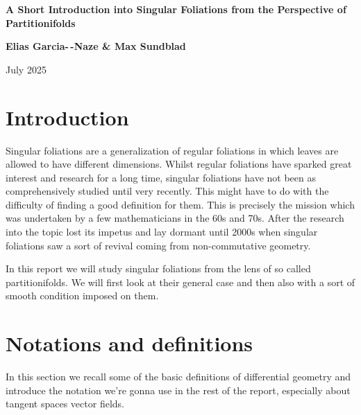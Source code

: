 



\begin{titlepage}
   \begin{center}
       \vspace*{4cm}

       {\LARGE
       \bf
       A Short Introduction into Singular Foliations from the Perspective of Partitionifolds
       }

       \vspace{1cm}

       {\large
       \textbf{Elias Garcia-\,\!-Naze \& Max Sundblad}
       }

       \vspace{0.5cm}

       July 2025
   \end{center}
\end{titlepage}

\tableofcontents

\newpage

\section{Introduction}
    Singular foliations are a generalization of regular foliations in which leaves are allowed to have different dimensions. Whilst regular foliations have sparked great interest and research for a long time, singular foliations have not been as comprehensively studied until very recently. This might have to do with the difficulty of finding a good definition for them. This is precisely the mission which was undertaken by a few mathematicians in the 60s and 70s. After the research into the topic lost its impetus and lay dormant until 2000s when singular foliations saw a sort of revival coming from non-commutative geometry.

    In this report we will study singular foliations from the lens of so called partitionifolds. We will first look at their general case and then also with a sort of smooth condition imposed on them.

\section{Notations and definitions}
    In this section we recall some of the basic definitions of differential geometry and introduce the notation we're gonna use in the rest of the report, especially about tangent spaces vector fields.

